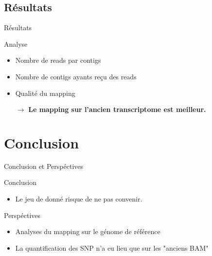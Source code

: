 \subsection{Résultats}
\begin{frame}{Résultats}

    \begin{block}{Analyse}
        \begin{itemize}
            \item Nombre de reads par contigs
            \item Nombre de contigs ayants reçu des reads
            \item Qualité du mapping
        \end{itemize}
    \end{block}

    \pause
    \begin{itemize}
        \item[$\rightarrow$] \textbf{Le mapping sur l'ancien transcriptome est meilleur.}
    \end{itemize}





\end{frame}

%
%

\section{Conclusion}

\begin{frame}{Conclusion et Perspéctives}
    \begin{alertblock}{Conclusion}
        \begin{itemize}
            \item Le jeu de donné risque de ne pas convenir.
        \end{itemize}
    \end{alertblock}

    \pause

    \begin{exampleblock}{Perspéctives}
        \begin{itemize}
            \item Analyses du mapping sur le génome de référence
            \item La quantification des SNP n'a eu lieu que sur les "anciens BAM"
        \end{itemize}
    \end{exampleblock}
\end{frame}


